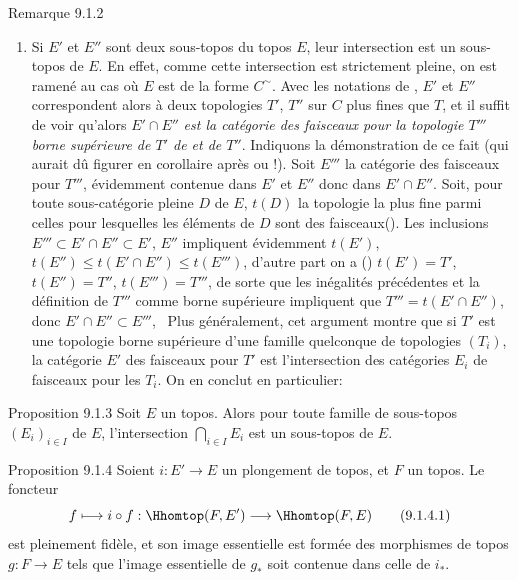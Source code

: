 \begin{enonce*}[remark]{Remarque 9.1.2}
\begin{enumerate}
\item Si $E'$ et $E''$ sont deux sous-topos du topos $E$, leur
intersection est un sous-topos de $E$. En effet, comme cette
intersection est strictement pleine, on est ramené au cas où $E$ est
de la forme $C^{\sim}$. Avec les notations de , $E'$ et $E''$
correspondent alors à deux topologies $T'$, $T''$ sur $C$ plus fines
que $T$, et il suffit de voir qu'alors $E'\cap E''$ \emph{est la
catégorie des faisceaux pour la topologie $T'''$ borne supérieure de
$T'$ de et de $T''$}. Indiquons la démonstration de ce fait (qui
aurait dû figurer en corollaire après  ou
 !). Soit $E'''$ la catégorie des faisceaux pour
$T'''$, évidemment contenue dans $E'$ et $E''$ donc dans $E'\cap
E''$. Soit, pour toute sous-catégorie pleine $D$ de $E$, $t(D)$ la
topologie la plus fine parmi celles pour lesquelles les éléments de
$D$ sont des faisceaux\pageoriginale (). Les
inclusions $E'''\subset E'\cap E''\subset E'$, $E''$ impliquent
évidemment $t(E')$, $t(E'')\leq t(E'\cap E'')\leq t(E''')$, d'autre
part on a () $t(E')=T'$, $t(E'')=T''$,
$t(E''')=T'''$, de sorte que les inégalités précédentes et la
définition de $T'''$ comme borne supérieure impliquent que
$T'''=t(E'\cap E'')$, donc $E'\cap E''\subset E'''$, \cqfd\  Plus
généralement, cet argument montre que si $T'$ est une topologie
borne supérieure d'une famille quelconque de topologies $(T_i)$, la
catégorie $E'$ des faisceaux pour $T'$ est l'intersection des
catégories $E_i$ de faisceaux pour les $T_i$. On en conclut en
particulier:
\end{enumerate}
\end{enonce*}

\begin{enonce*}[remark]{Proposition 9.1.3}
Soit $E$ un topos. Alors pour toute famille de sous-topos
$(E_i)_{i\in I}$ de $E$, l'intersection $\bigcap_{i\in I} E_i$ est
un sous-topos de $E$.
\end{enonce*}

\begin{enonce*}{Proposition 9.1.4}
Soient $i:E'\rightarrow E$ un plongement de topos, et $F$ un topos.
Le foncteur
\begin{equation*}
f\longmapsto i\circ f:\Hhomtop(F,E')\longrightarrow
\Hhomtop(F,E)\tag{9.1.4.1}
\end{equation*}
est pleinement fidèle, et son image essentielle est formée des
morphismes de topos $g:F\rightarrow E$ tels que l'image essentielle
de $g_{\ast}$ soit contenue dans celle de $i_{\ast}$.
\end{enonce*}

